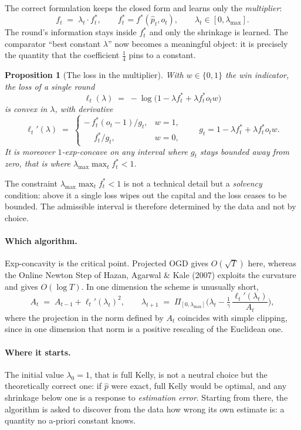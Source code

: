 \documentclass[12pt,a4paper,oneside]{report}
\renewcommand{\_}{\oldunderscore\allowbreak}
\theoremstyle{definition}
\theoremstyle{plain}
\newtheorem{proposition}[theorem]{Proposition}
\theoremstyle{remark}
\begin{document}
The correct formulation keeps the closed form and learns only the \emph{multiplier}:
\[
f_t \;=\; \lambda_t \cdot f^{*}_t, \qquad f^{*}_t = f^{*}(\hat{p}_t, o_t),
\qquad \lambda_t \in [0, \lambda_{\max}].
\]
The round's information stays inside $f^{*}_t$ and only the shrinkage is learned. The comparator
``best constant $\lambda$'' now becomes a meaningful object: it is precisely the quantity that
the coefficient $\tfrac14$ pins to a constant.

\begin{proposition}[The loss in the multiplier]
\label{prop:oco-kelly}
With $w \in \{0,1\}$ the win indicator, the loss of a single round
\[
\ell_t(\lambda) \;=\; -\log\big(1 - \lambda f^{*}_t + \lambda f^{*}_t o_t w\big)
\]
is convex in $\lambda$, with derivative
\[
\ell_t'(\lambda) \;=\;
\begin{cases}
-\,f^{*}_t (o_t-1) / g_t, & w=1,\\[2pt]
\phantom{-}f^{*}_t / g_t, & w=0,
\end{cases}
\qquad g_t = 1 - \lambda f^{*}_t + \lambda f^{*}_t o_t w .
\]
It is moreover $1$-exp-concave on any interval where $g_t$ stays bounded away from zero, that is
where $\lambda_{\max}\max_t f^{*}_t < 1$.
\end{proposition}

The constraint $\lambda_{\max}\max_t f^{*}_t < 1$ is not a technical detail but a
\emph{solvency} condition: above it a single loss wipes out the capital and the loss ceases to be
bounded. The admissible interval is therefore determined by the data and not by choice.

\paragraph{Which algorithm.} Exp-concavity is the critical point. Projected OGD gives $O(\sqrt{T})$
here, whereas the Online Newton Step of Hazan, Agarwal \& Kale (2007) exploits the curvature and
gives $O(\log T)$. In one dimension the scheme is unusually short,
\[
A_t \;=\; A_{t-1} + \ell_t'(\lambda_t)^2, \qquad
\lambda_{t+1} \;=\; \Pi_{[0,\lambda_{\max}]}\Big(\lambda_t - \tfrac{1}{\gamma}\,
\frac{\ell_t'(\lambda_t)}{A_t}\Big),
\]
where the projection in the norm defined by $A_t$ coincides with simple clipping, since in one
dimension that norm is a positive rescaling of the Euclidean one.

\paragraph{Where it starts.} The initial value $\lambda_0 = 1$, that is full Kelly, is not a
neutral choice but the theoretically correct one: if $\hat{p}$ were exact, full Kelly would be
optimal, and any shrinkage below one is a response to \emph{estimation error}. Starting from
there, the algorithm is asked to discover from the data how wrong its own estimate is: a
quantity no a-priori constant knows.
\end{document}
